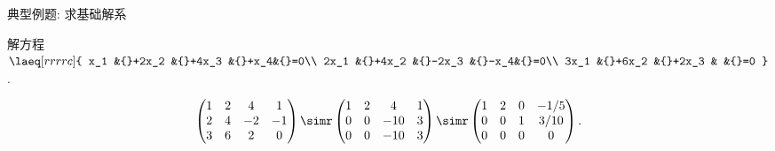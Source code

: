 \begin{frame}{典型例题: 求基础解系}
	\onslide<+->
	\begin{example}
		解方程 $\laeq[rrrrc]{
			x_1  &{}+2x_2 &{}+4x_3 &{}+x_4&{}=0\\
			2x_1 &{}+4x_2 &{}-2x_3 &{}-x_4&{}=0\\
			3x_1 &{}+6x_2 &{}+2x_3 &      &{}=0
		}$.
	\end{example}
	\onslide<+->
	\begin{solution}
		\[\begin{pmatrix}
			1&2&4&1\\
			2&4&-2&-1\\
			3&6&2&0
		\end{pmatrix}\simr\begin{pmatrix}
			1&2&4&1\\
			0&0&-10&3\\
			0&0&-10&3
		\end{pmatrix}\simr\begin{pmatrix}
			1&2&0&-1/5\\
			0&0&1&3/10\\
			0&0&0&0
		\end{pmatrix}.\]
	\end{solution}
\end{frame}


